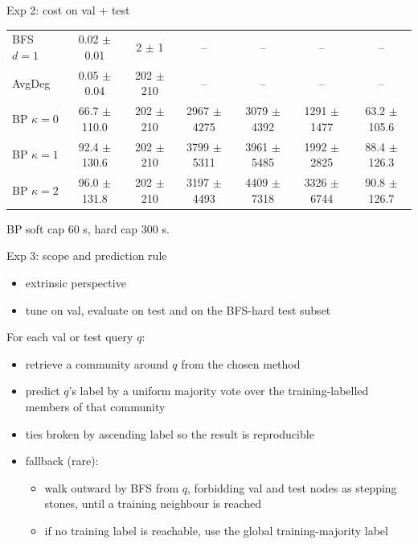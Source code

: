 \documentclass{beamer}
\begin{document}
\begin{frame}{Exp 2: cost on val + test}
\begin{center}
\begin{tabular}{lcccccc}
    BFS $d{=}1$              & 0.02 $\pm$ 0.01  & 2 $\pm$ 1     & --                 & --                  & --                  & --              \\
    AvgDeg                   & 0.05 $\pm$ 0.04  & 202 $\pm$ 210 & --                 & --                  & --                  & --              \\
    BP $\kappa{=}0$          & 66.7 $\pm$ 110.0 & 202 $\pm$ 210 & 2967 $\pm$ 4275    & 3079 $\pm$ 4392     & 1291 $\pm$ 1477     & 63.2 $\pm$ 105.6 \\
    BP $\kappa{=}1$          & 92.4 $\pm$ 130.6 & 202 $\pm$ 210 & 3799 $\pm$ 5311    & 3961 $\pm$ 5485     & 1992 $\pm$ 2825     & 88.4 $\pm$ 126.3 \\
    BP $\kappa{=}2$          & 96.0 $\pm$ 131.8 & 202 $\pm$ 210 & 3197 $\pm$ 4493    & 4409 $\pm$ 7318     & 3326 $\pm$ 6744     & 90.8 $\pm$ 126.7 \\
    \bottomrule
  \end{tabular}
  \end{center}

  \vfill

  \scriptsize BP soft cap $60$ s, hard cap $300$ s.
\end{frame}

\begin{frame}{Exp 3: scope and prediction rule}
  \begin{itemize}
    \item extrinsic perspective
    \item tune on val, evaluate on test and on the BFS-hard test
          subset
  \end{itemize}

  \vfill

  For each val or test query $q$:
  \begin{itemize}
    \item retrieve a community around $q$ from the chosen method
    \item predict $q$'s label by a uniform majority vote over the training-labelled members of that community
    \item ties broken by ascending label so the result is
          reproducible
    \item fallback (rare):
          \begin{itemize}
            \item walk outward by BFS from $q$, forbidding val and test nodes as stepping stones, until a training neighbour is reached
            \item if no training label is reachable, use the global training-majority label
          \end{itemize}
  \end{itemize}
\end{frame}
\end{document}
